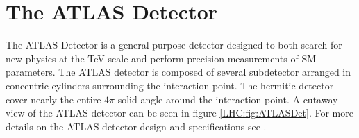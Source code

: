 




\section{The ATLAS Detector}
\label{LHC:detector}

\indent The ATLAS Detector is a general purpose detector designed to both search for new physics at the TeV scale and perform precision measurements of SM parameters.  The ATLAS detector is composed of several subdetector arranged in concentric cylinders surrounding the interaction point.  The hermitic detector cover nearly the entire $4\pi$ solid angle around the interaction point. A cutaway view of the ATLAS detector can be seen in figure \ref{LHC:fig:ATLASDet}.  For more details on the ATLAS detector design and specifications see \cite{ATLAS_JINST}.  \\

